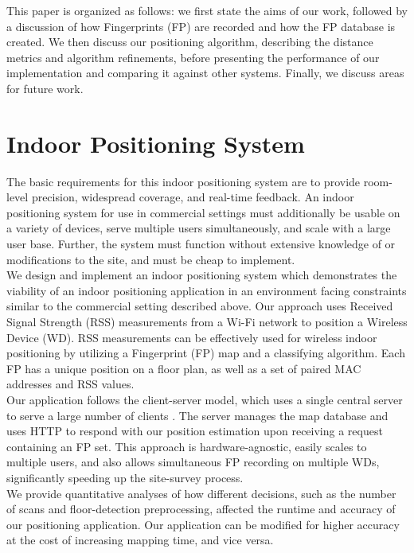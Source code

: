 \documentclass[conference]{IEEEtran}
\begin{document}
\indent This paper is organized as follows: we first state the aims of our work, followed by a discussion of how Fingerprints (FP) are recorded and how the FP database is created. We then discuss our positioning algorithm, describing the distance metrics and algorithm refinements, before presenting the performance of our implementation and comparing it against other systems. Finally, we discuss areas for future work.

\section{Indoor Positioning System}
The basic requirements for this indoor positioning system are to provide room-level precision, widespread coverage, and real-time feedback. An indoor positioning system for use in commercial settings must additionally be usable on a variety of devices, serve multiple users simultaneously, and scale with a large user base. Further, the system must function without extensive knowledge of or modifications to the site, and must be cheap to implement. \\
\indent We design and implement an indoor positioning system which demonstrates the viability of an indoor positioning application in an environment facing constraints similar to the commercial setting described above. Our approach uses Received Signal Strength (RSS) measurements from a Wi-Fi network to position a Wireless Device (WD). RSS measurements can be effectively used for wireless indoor positioning by utilizing a Fingerprint (FP) map and a classifying algorithm. Each FP has a unique position on a floor plan, as well as a set of paired MAC addresses and RSS values.\\
\indent Our application follows the client-server model, which uses a single central server to serve a large number of clients \cite{Fielding}. The server manages the map database and uses HTTP to respond with our position estimation upon receiving a request containing an FP set. This approach is hardware-agnostic, easily scales to multiple users, and also allows simultaneous FP recording on multiple WDs, significantly speeding up the site-survey process.\\ 
\indent We provide quantitative analyses of how different decisions, such as the number of scans and floor-detection preprocessing, affected the runtime and accuracy of our positioning application. Our application can be modified for higher accuracy at the cost of increasing mapping time, and vice versa.
\end{document}
